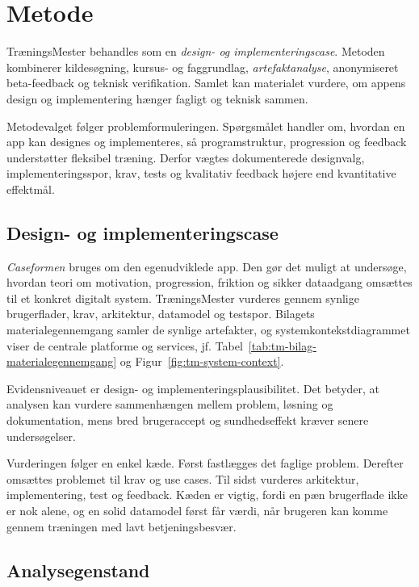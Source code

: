 \section{Metode}

TræningsMester behandles som en \emph{design- og implementeringscase}. Metoden kombinerer kildesøgning, kursus- og faggrundlag, \emph{artefaktanalyse}, anonymiseret beta-feedback og teknisk verifikation. Samlet kan materialet vurdere, om appens design og implementering hænger fagligt og teknisk sammen.

Metodevalget følger problemformuleringen. Spørgsmålet handler om, hvordan en app kan designes og implementeres, så programstruktur, progression og feedback understøtter fleksibel træning. Derfor vægtes dokumenterede designvalg, implementeringsspor, krav, tests og kvalitativ feedback højere end kvantitative effektmål.

\subsection{Design- og implementeringscase}

\emph{Caseformen} bruges om den egenudviklede app. Den gør det muligt at undersøge, hvordan teori om motivation, progression, friktion og sikker dataadgang omsættes til et konkret digitalt system. TræningsMester vurderes gennem synlige brugerflader, krav, arkitektur, datamodel og testspor. Bilagets materialegennemgang samler de synlige artefakter, og systemkontekstdiagrammet viser de centrale platforme og services, jf. Tabel~\ref{tab:tm-bilag-materialegennemgang} og Figur~\ref{fig:tm-system-context}.

Evidensniveauet er design- og implementeringsplausibilitet. Det betyder, at analysen kan vurdere sammenhængen mellem problem, løsning og dokumentation, mens bred brugeraccept og sundhedseffekt kræver senere undersøgelser.

Vurderingen følger en enkel kæde. Først fastlægges det faglige problem. Derefter omsættes problemet til krav og use cases. Til sidst vurderes arkitektur, implementering, test og feedback. Kæden er vigtig, fordi en pæn brugerflade ikke er nok alene, og en solid datamodel først får værdi, når brugeren kan komme gennem træningen med lavt betjeningsbesvær.

\subsection{Analysegenstand}

